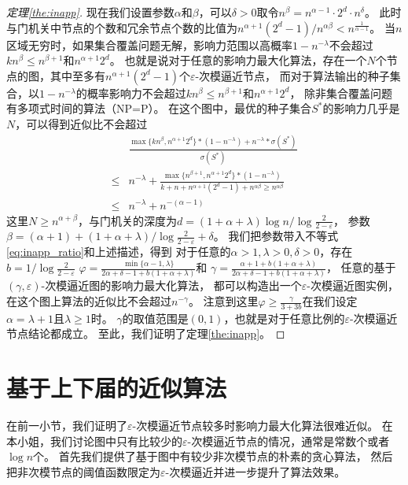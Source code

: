 \begin{proof}[定理\ref{the:inapp}]
现在我们设置参数$\alpha$和$\beta$，可以$\delta>0$取令$n^{\beta} = n^{\alpha-1} \cdot 2^d \cdot n^{\delta}$。
此时与门机关中节点的个数和冗余节点个数的比值为$n^{\alpha+1}(2^d-1) / n^{\alpha\beta} < n^{\frac{1}{\alpha-1}}$。
当$n$区域无穷时，如果集合覆盖问题无解，影响力范围以高概率$1-n^{-\lambda}$不会超过$kn^{\beta} \leq n^{\beta+1}$和$n^{\alpha+1}2^d$。
也就是说对于任意的影响力最大化算法，存在一个$N$个节点的图，其中至多有$n^{\alpha+1}(2^d-1)$个$\varepsilon$-次模逼近节点，
而对于算法输出的种子集合，以$1-n^{-\lambda}$的概率影响力不会超过$kn^{\beta} \leq n^{\beta+1}$和$n^{\alpha+1}2^d$，
除非集合覆盖问题有多项式时间的算法（NP=P）。
在这个图中，最优的种子集合$S^*$的影响力几乎是$N$，可以得到近似比不会超过
\begin{equation}
\label{eq:inapp_ratio}
\begin{array}{ll}
& \frac{\max\{kn^{\beta}, n^{\alpha+1}2^d\} * (1-n^{-\lambda}) + n^{-\lambda} * \sigma(S^*)}{\sigma(S^*)} \\
\leq & n^{-\lambda} + 
\frac{\max\{n^{\beta+1}, n^{\alpha+1}2^d\} * (1-n^{-\lambda})}
{k+n+n^{\alpha+1}(2^d-1)+n^{\alpha\beta} \geq n^{\alpha\beta}} \\
\leq & n^{-\lambda} + n^{-(\alpha-1)}
\end{array}
\end{equation}
这里$N \geq n^{\alpha+\beta}$，与门机关的深度为$d = (1+\alpha+\lambda)\log n / \log{\frac{2}{2-\varepsilon}}$，
参数$\beta = (\alpha+1) + (1+\alpha+\lambda) / \log{\frac{2}{2-\varepsilon}} + \delta$。
我们把参数带入不等式\ref{eq:inapp_ratio}和上述描述，得到
对于任意的$\alpha>1, \lambda>0, \delta>0$，存在$b = 1/\log{\frac{2}{2-\varepsilon}}$
$\varphi= \frac{ \min\{\alpha-1, \lambda\}}{2\alpha+\delta-1+b(1+\alpha+\lambda)}$和
$\gamma =\frac{\alpha+1+b(1+\alpha+\lambda)}{2\alpha+\delta-1+b(1+\alpha+\lambda)}$，
任意的基于$(\gamma,\varepsilon)$-次模逼近图的影响力最大化算法，
都可以构造出一个$\varepsilon$-次模逼近图实例，在这个图上算法的近似比不会超过$n^{-\gamma}$。
注意到这里$\varphi \geq \frac{\gamma}{3+3b}$在我们设定 $\alpha=\lambda+1$且$\lambda \geq 1$时。
$\gamma$的取值范围是$(0,1)$，也就是对于任意比例的$\varepsilon$-次模逼近节点结论都成立。
至此，我们证明了定理\ref{the:inapp}。
\end{proof}

\section{基于上下届的近似算法}
在前一小节，我们证明了$\varepsilon$-次模逼近节点较多时影响力最大化算法很难近似。
在本小姐，我们讨论图中只有比较少的$\varepsilon$-次模逼近节点的情况，通常是常数个或者$\log n$个。
首先我们提供了基于图中有较少非次模节点的朴素的贪心算法，
然后把非次模节点的阈值函数限定为$\varepsilon$-次模逼近并进一步提升了算法效果。



